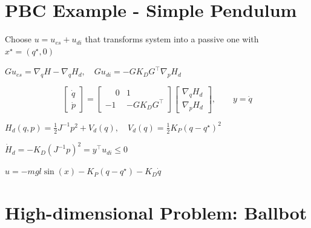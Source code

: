 \documentclass[
]{report}
\begin{document}
\hypertarget{pbc-example---simple-pendulum-1}{%
\section{PBC Example - Simple
Pendulum}\label{pbc-example---simple-pendulum-1}}

\begin{tcolorbox}[enhanced jigsaw, opacityback=0, breakable, leftrule=.75mm, toptitle=1mm, rightrule=.15mm, toprule=.15mm, bottomrule=.15mm, opacitybacktitle=0.6, colbacktitle=quarto-callout-tip-color!10!white, colframe=quarto-callout-tip-color-frame, title={Control Synthesis via PBC}, bottomtitle=1mm, left=2mm, colback=white, arc=.35mm, titlerule=0mm, coltitle=black]

Choose \(u = u_{es} + u_{di}\) that transforms system into a passive one
with \(x^\star = (q^\star, 0)\)

\(Gu_{es} = \nabla_q H - \nabla_q H_d , \quad Gu_{di} = -GK_D G^\top \nabla_p H_d\)

\[
\begin{bmatrix} \dot{q} \\ \dot{p} \end{bmatrix} = 
\begin{bmatrix} \phantom{-}0 & 1 \\ -1 & -G K_D G^\top \end{bmatrix} 
\begin{bmatrix} \nabla_q H_d \\ \nabla_p H_d \end{bmatrix},
\qquad y = \dot{q}
\]

\(H_d(q,p) = \frac{1}{2} J^{-1} p^2 + V_d(q), \quad V_d(q) = \frac{1}{2} K_{P} \left( q - q^\star \right)^2\)

\(\dot{H}_d = -K_D \left( J^{-1} p \right)^2 = y^\top u_{di} \leq 0\)

\(\boxed{u = -mgl\sin(x) - K_P(q - q^\star) - K_D \dot{q}}\)

\end{tcolorbox}

\hypertarget{high-dimensional-problem-ballbot}{%
\section{High-dimensional Problem:
Ballbot}\label{high-dimensional-problem-ballbot}}
\end{document}
